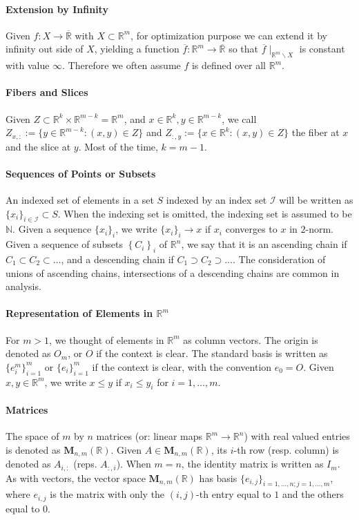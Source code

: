\paragraph{Extension by Infinity}Given $f:X\to\overline{\mathbb{R}}$ with $X\subset \mathbb{R}^m$, for optimization purpose we can extend it by infinity out side of $X$, yielding a function $\overline{f}:\mathbb{R}^m\to\overline{\mathbb{R}}$ so that $\overline{f}\mid_{\mathbb{R}^m\smallsetminus X}$ is constant with value $\infty$. Therefore we often assume $f$ is defined over all $\mathbb{R}^m$.

\paragraph{Fibers and Slices}Given $Z\subset \mathbb{R}^{k}\times \mathbb{R}^{m-k}=\mathbb{R}^m$, and $x\in \mathbb{R}^k,y\in \mathbb{R}^{m-k}$, we call $Z_{x,:}:=\{y\in \mathbb{R}^{m-k}:(x,y)\in Z\}$ and $Z_{:,y}:=\{x\in \mathbb{R}^{k}:(x,y)\in Z\}$ the fiber at $x$ and the slice at $y$. Most of the time, $k=m-1$.

\paragraph{Sequences of Points or Subsets}An indexed set of elements in a set $S$ indexed by an index set $\mathcal{I}$ will be written as $\{x_i\}_{i\in \mathcal{I}}\subset S$. When the indexing set is omitted, the indexing set is assumed to be $\mathbb{N}$. Given a sequence $\{x_i\}_{i}$, we write $\{x_i\}_i\to x$ if $x_i$ converges to $x$ in $2$-norm. Given a sequence of subsets $\left\{C_i\right\}_{i}$ of $\mathbb{R}^n$, we say that it is an ascending chain if $C_1\subset C_2\subset \dotsc$, and a descending chain if $C_1\supset C_2\supset \dotsc$. The consideration of unions of ascending chains, intersections of a descending chains are common in analysis.

\paragraph{Representation of Elements in $\mathbb{R}^m$}For $m>1$, we thought of elements in $\mathbb{R}^m$ as column vectors. The origin is denoted as $O_m$, or $O$ if the context is clear. The standard basis is written as $\{e_i^m\}_{i=1}^m$ or $\{e_i\}_{i=1}^m$ if the context is clear, with the convention $e_0=O$. Given $x,y\in \mathbb{R}^m$, we write $x\leq y$ if $x_i\leq y_i$ for $i=1,\dotsc,m$.

\paragraph{Matrices}The space of $m$ by $n$ matrices (or: linear maps $\mathbb{R}^m\to \mathbb{R}^n$) with real valued entries is denoted as $\mathbf{M}_{n,m}(\mathbb{R})$. Given $A\in \mathbf{M}_{n,m}(\mathbb{R})$, its $i$-th row (resp. column) is denoted as $A_{i,:}$ (reps. $A_{:,i}$). When $m=n$, the identity matrix is written as $I_m$. As with vectors, the vector space $\mathbf{M}_{n,m}(\mathbb{R})$ has basis $\{e_{i,j}\}_{i=1,\dotsc,n; j=1,\dotsc, m}$, where $e_{i,j}$ is the matrix with only the $(i,j)$-th entry equal to $1$ and the others equal to $0$.

